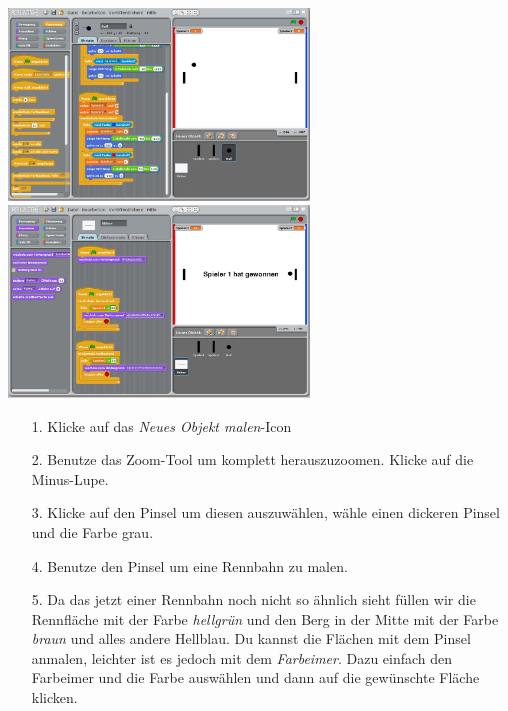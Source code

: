 \includegraphics[width=0.6\textwidth]{images/aufgabe5_pong_spieler_variablen_2.png}
\includegraphics[width=0.6\textwidth]{images/aufgabe5_pong_spieler_variablen_3.png}





\begin{itemize}
\item[1. ] Klicke auf das \textit{Neues Objekt malen}-Icon
\end{itemize}

\begin{itemize}
\item[2. ] Benutze das Zoom-Tool um komplett herauszuzoomen. Klicke auf die Minus-Lupe.
\end{itemize}

\begin{itemize}
\item[3. ] Klicke auf den Pinsel um diesen auszuwählen, wähle einen dickeren Pinsel und die Farbe grau.
\end{itemize}

\begin{itemize}
\item[4. ] Benutze den Pinsel um eine Rennbahn zu malen.
\end{itemize}

\begin{itemize}
\item[5. ] Da das jetzt einer Rennbahn noch nicht so ähnlich sieht füllen wir die Rennfläche mit der Farbe \emph{hellgrün} und den Berg in der Mitte mit der Farbe \emph{braun} und alles andere Hellblau. Du kannst die Flächen mit dem Pinsel anmalen, leichter ist es jedoch mit dem \emph{Farbeimer}. Dazu einfach den Farbeimer und die Farbe auswählen und dann auf die gewünschte Fläche klicken.
\end{itemize}

